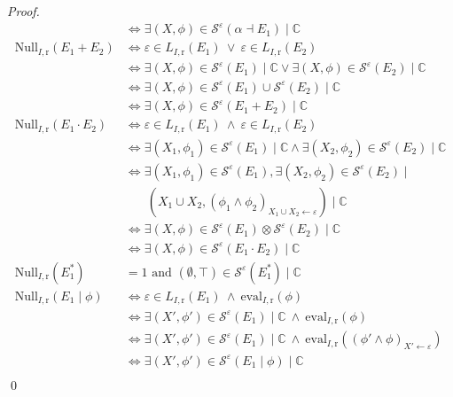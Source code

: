 \documentclass[a4paper]{llncs}
\begin{document}
\begin{proof}
\begin{align*}
        & \Longleftrightarrow \exists(X,\phi)\in\mathcal{S}^{\varepsilon}(\alpha\dashv E_1)\mid\mathbb{C}\\
        \mathrm{Null}_{I,\mathrm{r}}(E_1+E_2) & \Longleftrightarrow \varepsilon\in L_{I,\mathrm{r}}(E_1)\ \vee\ \varepsilon\in L_{I,\mathrm{r}}(E_2)\\
        & \Longleftrightarrow \exists(X,\phi)\in\mathcal{S}^{\varepsilon}(E_1)\mid\mathbb{C} \vee \exists(X,\phi)\in\mathcal{S}^{\varepsilon}(E_2)\mid\mathbb{C}\\
        & \Longleftrightarrow \exists(X,\phi)\in\mathcal{S}^{\varepsilon}(E_1)\cup\mathcal{S}^{\varepsilon}(E_2)\mid\mathbb{C}\\
        & \Longleftrightarrow \exists(X,\phi)\in\mathcal{S}^{\varepsilon}(E_1+E_2)\mid\mathbb{C}\\
        \mathrm{Null}_{I,\mathrm{r}}(E_1\cdot E_2) & \Longleftrightarrow \varepsilon\in L_{I,\mathrm{r}}(E_1)\ \wedge\ \varepsilon\in L_{I,\mathrm{r}}(E_2)\\
        & \Longleftrightarrow \exists(X_1,\phi_1)\in\mathcal{S}^{\varepsilon}(E_1)\mid\mathbb{C} \wedge \exists(X_2,\phi_2)\in\mathcal{S}^{\varepsilon}(E_2)\mid\mathbb{C}\\
        & \Longleftrightarrow \exists(X_1,\phi_1)\in\mathcal{S}^{\varepsilon}(E_1), \exists(X_2,\phi_2)\in\mathcal{S}^{\varepsilon}(E_2)\mid\\
        & \ \ \ \ \ \ \ \ (X_1\cup X_2,(\phi_1\wedge\phi_2)_{X_1\cup X_2\leftarrow\varepsilon})\mid\mathbb{C}\\
        & \Longleftrightarrow\exists(X,\phi)\in\mathcal{S}^{\varepsilon}(E_1)\otimes \mathcal{S}^{\varepsilon}(E_2)\mid\mathbb{C}\\
      & \Longleftrightarrow \exists(X,\phi)\in\mathcal{S}^{\varepsilon}(E_1\cdot E_2)\mid\mathbb{C}\\
      \mathrm{Null}_{I,\mathrm{r}}(E_1^*)&=1\text{ and }(\emptyset,\top)\in\mathcal{S}^{\varepsilon}(E_1^*)\mid \mathbb{C}\\
      \mathrm{Null}_{I,\mathrm{r}}(E_1\mid\phi) & \Longleftrightarrow\varepsilon\in L_{I,\mathrm{r}}(E_1)\ \wedge\ \mathrm{eval}_{I,\mathrm{r}}(\phi)\\
      & \Longleftrightarrow \exists(X',\phi')\in\mathcal{S}^{\varepsilon}(E_1)\mid\mathbb{C}\ \wedge\ \mathrm{eval}_{I,\mathrm{r}}(\phi)\\
      & \Longleftrightarrow \exists(X',\phi')\in\mathcal{S}^{\varepsilon}(E_1)\mid\mathbb{C}\ \wedge\ \mathrm{eval}_{I,\mathrm{r}}((\phi'\wedge\phi)_{X'\leftarrow\varepsilon})\\
      & \Longleftrightarrow \exists(X',\phi')\in\mathcal{S}^{\varepsilon}(E_1\mid\phi)\mid\mathbb{C}\\
        \end{align*}    
    \qed
  \end{proof} 
  
\end{document}
